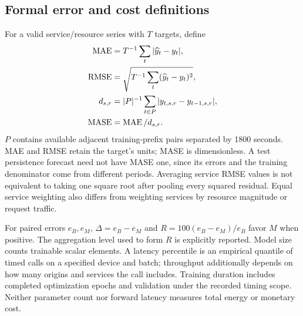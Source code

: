 \subsection{Formal error and cost definitions}
For a valid service/resource series with $T$ targets, define
\begin{align}
\operatorname{MAE}&=T^{-1}\sum_t|\widehat y_t-y_t|,\notag\\
\operatorname{RMSE}&=\sqrt{T^{-1}\sum_t(\widehat y_t-y_t)^2},\\
d_{s,r}&=|P|^{-1}\sum_{t\in P}|y_{t,s,r}-y_{t-1,s,r}|,\notag\\
\operatorname{MASE}&=\operatorname{MAE}/d_{s,r}.
\end{align}
$P$ contains available adjacent training-prefix pairs separated by 1800 seconds. MAE and RMSE retain the target's units; MASE is dimensionless. A test persistence forecast need not have MASE one, since its errors and the training denominator come from different periods. Averaging service RMSE values is not equivalent to taking one square root after pooling every squared residual. Equal service weighting also differs from weighting services by resource magnitude or request traffic.

For paired errors $e_B,e_M$, $\Delta=e_B-e_M$ and $R=100(e_B-e_M)/e_B$ favor $M$ when positive. The aggregation level used to form $R$ is explicitly reported. Model size counts trainable scalar elements. A latency percentile is an empirical quantile of timed calls on a specified device and batch; throughput additionally depends on how many origins and services the call includes. Training duration includes completed optimization epochs and validation under the recorded timing scope. Neither parameter count nor forward latency measures total energy or monetary cost.

